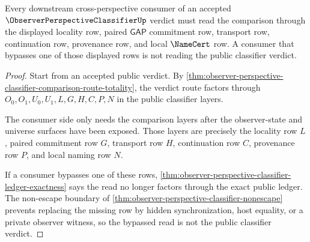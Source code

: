 \begin{theorem}
\label{thm:observer-perspective-classifier-alignment-consumer}
Every downstream cross-perspective consumer of an accepted $\ObserverPerspectiveClassifierUp$ verdict must read the comparison through the displayed locality row, paired $\mathsf{GAP}$ commitment row, transport row, continuation row, provenance row, and local $\NameCert$ row. A consumer that bypasses one of those displayed rows is not reading the public classifier verdict.
\end{theorem}
\begin{proof}
Start from an accepted public verdict. By \autoref{thm:observer-perspective-classifier-comparison-route-totality}, the verdict route factors through $O_0,O_1,U_0,U_1,L,G,H,C,P,N$ in the public classifier layers.

The consumer side only needs the comparison layers after the observer-state and universe surfaces have been exposed. Those layers are precisely the locality row $L$, paired commitment row $G$, transport row $H$, continuation row $C$, provenance row $P$, and local naming row $N$.

If a consumer bypasses one of these rows, \autoref{thm:observer-perspective-classifier-ledger-exactness} says the read no longer factors through the exact public ledger. The non-escape boundary of \autoref{thm:observer-perspective-classifier-nonescape} prevents replacing the missing row by hidden synchronization, host equality, or a private observer witness, so the bypassed read is not the public classifier verdict.
\end{proof}


